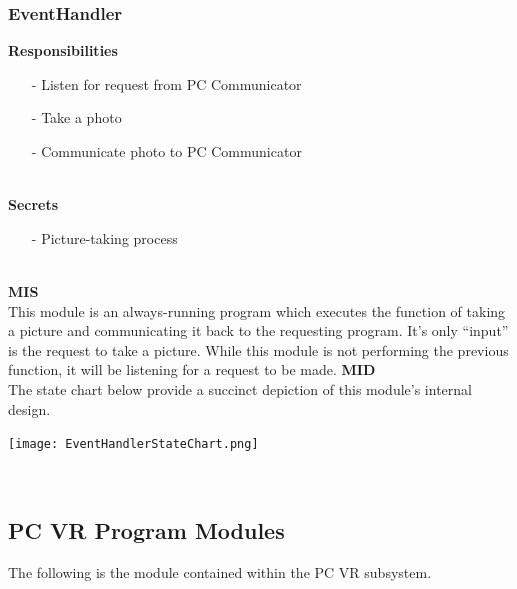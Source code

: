 \documentclass[titlepage]{article}
\begin{document}
\subsubsection{EventHandler}
\textbf{Responsibilities}
\begin{itemize}
	\item[-] Listen for request from PC Communicator
	\item[-] Take a photo
	\item[-] Communicate photo to PC Communicator
\end{itemize}~\\
\textbf{Secrets}
\begin{itemize}
	\item[-] Picture-taking process
\end{itemize}~\\
\textbf{MIS}\\[2mm]
This module is an always-running program which executes the function of taking a picture and communicating it back to the requesting program. It's only ``input'' is the request to take a picture. While this module is not performing the previous function, it will be listening for a request to be made.
\newpage
\textbf{MID}\\[2mm]
The state chart below provide a succinct depiction of this module's internal design.\\
\begin{center}
	\texttt{[image: EventHandlerStateChart.png]}
\label{fig:EventHandlerStateChart}
\end{center}~\\

\subsection{PC VR Program Modules}
The following is the module contained within the PC VR subsystem.
\end{document}
